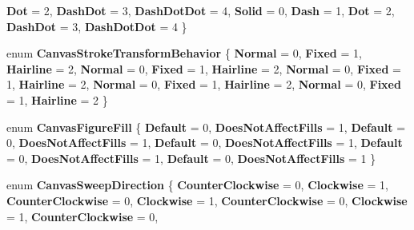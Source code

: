 \begin{DoxyCompactItemize}
{\bfseries Dot} = 2, 
{\bfseries Dash\+Dot} = 3, 
{\bfseries Dash\+Dot\+Dot} = 4, 
\newline
{\bfseries Solid} = 0, 
{\bfseries Dash} = 1, 
{\bfseries Dot} = 2, 
{\bfseries Dash\+Dot} = 3, 
\newline
{\bfseries Dash\+Dot\+Dot} = 4
 \}
\item 
\mbox{\label{namespace_microsoft_1_1_graphics_1_1_canvas_1_1_geometry_a79c0c14002e1ebbc20c430497d584867}} 
enum {\bfseries Canvas\+Stroke\+Transform\+Behavior} \{ \newline
{\bfseries Normal} = 0, 
{\bfseries Fixed} = 1, 
{\bfseries Hairline} = 2, 
{\bfseries Normal} = 0, 
\newline
{\bfseries Fixed} = 1, 
{\bfseries Hairline} = 2, 
{\bfseries Normal} = 0, 
{\bfseries Fixed} = 1, 
\newline
{\bfseries Hairline} = 2, 
{\bfseries Normal} = 0, 
{\bfseries Fixed} = 1, 
{\bfseries Hairline} = 2, 
\newline
{\bfseries Normal} = 0, 
{\bfseries Fixed} = 1, 
{\bfseries Hairline} = 2
 \}
\item 
\mbox{\label{namespace_microsoft_1_1_graphics_1_1_canvas_1_1_geometry_aff867f5434d5804c2b0bcc7ada82e275}} 
enum {\bfseries Canvas\+Figure\+Fill} \{ \newline
{\bfseries Default} = 0, 
{\bfseries Does\+Not\+Affect\+Fills} = 1, 
{\bfseries Default} = 0, 
{\bfseries Does\+Not\+Affect\+Fills} = 1, 
\newline
{\bfseries Default} = 0, 
{\bfseries Does\+Not\+Affect\+Fills} = 1, 
{\bfseries Default} = 0, 
{\bfseries Does\+Not\+Affect\+Fills} = 1, 
\newline
{\bfseries Default} = 0, 
{\bfseries Does\+Not\+Affect\+Fills} = 1
 \}
\item 
\mbox{\label{namespace_microsoft_1_1_graphics_1_1_canvas_1_1_geometry_ac9b0f6a16960b87589d16512e46f64c1}} 
enum {\bfseries Canvas\+Sweep\+Direction} \{ \newline
{\bfseries Counter\+Clockwise} = 0, 
{\bfseries Clockwise} = 1, 
{\bfseries Counter\+Clockwise} = 0, 
{\bfseries Clockwise} = 1, 
\newline
{\bfseries Counter\+Clockwise} = 0, 
{\bfseries Clockwise} = 1, 
{\bfseries Counter\+Clockwise} = 0, 

\end{DoxyCompactItemize}
